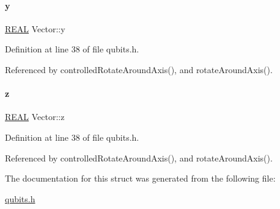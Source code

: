 \mbox{\label{structVector_a375ca805d4c808a53d7c4e0c737ae3de}} 
\paragraph{\texorpdfstring{y}{y}}
{\footnotesize\ttfamily \mbox{\hyperlink{precision_8h_a4b654506f18b8bfd61ad2a29a7e38c25}{R\+E\+AL}} Vector\+::y}



Definition at line 38 of file qubits.\+h.



Referenced by controlled\+Rotate\+Around\+Axis(), and rotate\+Around\+Axis().

\mbox{\label{structVector_ad4e863651be7d6b7e2b28cd7445a0ccf}} 
\paragraph{\texorpdfstring{z}{z}}
{\footnotesize\ttfamily \mbox{\hyperlink{precision_8h_a4b654506f18b8bfd61ad2a29a7e38c25}{R\+E\+AL}} Vector\+::z}



Definition at line 38 of file qubits.\+h.



Referenced by controlled\+Rotate\+Around\+Axis(), and rotate\+Around\+Axis().



The documentation for this struct was generated from the following file\+:\begin{DoxyCompactItemize}
\item 
\mbox{\hyperlink{qubits_8h}{qubits.\+h}}\end{DoxyCompactItemize}
